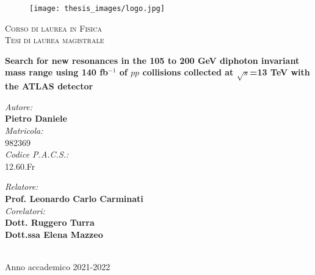 \documentclass[a4paper, oneside, 11pt, openright]{book}
\begin{document}
	\begin{titlepage}
		\begin{figure}
			\texttt{[image: thesis\_images/logo.jpg]}
		\end{figure}
		\begin{center}
			\textsc{\large Corso di laurea in Fisica}\\[0.2cm]
			\textsc{\normalsize Tesi di laurea magistrale}\\[2cm]
			
			\begin{doublespace}
				\textbf{\LARGE Search for new resonances in the 105 to 200 GeV diphoton invariant mass range using 140 fb$^{-1}$ of $pp$ collisions collected at $\sqrt{s}$=13 TeV with the ATLAS detector}
				\\[2cm]
			\end{doublespace}
			
			\begin{minipage}{0.4\textwidth}
				\begin{flushleft}
					\emph{Autore:} \\[0mm]
					\textbf{Pietro Daniele} \\[4mm]
					\emph{Matricola:}\\
					982369 \\[4mm]
					\emph{Codice P.A.C.S.:}\\[0mm]
					12.60.Fr
				\end{flushleft}
			\end{minipage}
			\begin{minipage}{0.4\textwidth}
				\begin{flushright} 
					\emph{Relatore:} \\
					\textbf{Prof. Leonardo Carlo Carminati} \\[1.2em]
					\emph{Corelatori:} \\
					\textbf{Dott. Ruggero Turra} \\
					\textbf{Dott.ssa Elena Mazzeo} \\[1.2em]
				\end{flushright}
			\end{minipage}\\[2cm]
			\vfill
			Anno accademico 2021-2022
		\end{center}
		
		
	\end{titlepage}
	
\end{document}
